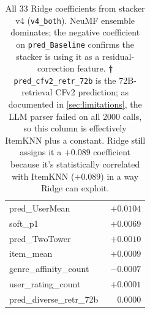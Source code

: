 \documentclass[11pt,a4paper]{article}
\begin{document}
\begin{table}[H]
\begin{tabular}{lr}
pred\_UserMean               & $+0.0104$ \\
soft\_p1                     & $+0.0069$ \\
pred\_TwoTower               & $+0.0010$ \\
item\_mean                   & $+0.0009$ \\
genre\_affinity\_count       & $-0.0007$ \\
user\_rating\_count          & $+0.0001$ \\
pred\_diverse\_retr\_72b     & $\phantom{+}0.0000$ \\
\bottomrule
\end{tabular}
\caption{All 33 Ridge coefficients from stacker v4 (\texttt{v4\_both}).
NeuMF ensemble dominates; the negative coefficient on \texttt{pred\_Baseline}
confirms the stacker is using it as a residual-correction feature.
\textbf{†} \texttt{pred\_cfv2\_retr\_72b} is the 72B-retrieval CFv2 prediction;
as documented in \cref{sec:limitations}, the LLM parser failed on all
2000 calls, so this column is effectively ItemKNN plus a constant. Ridge
still assigns it a $+0.089$ coefficient because it's statistically
correlated with ItemKNN ($+0.089$) in a way Ridge can exploit.}
\end{table}
\end{document}
